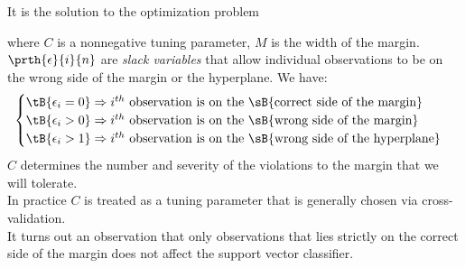 It is the solution to the optimization problem
\begin{center}
\end{center}
where $C$ is a nonnegative tuning parameter, $M$ is the width of the 
margin.\\
$\prth{\epsilon}{i}{n}$ are \emph{slack variables} that allow 
individual observations to be on the wrong side of the margin or the
hyperplane.
We have:
$$
\begin{cases}
	\tB{\epsilon_{i}=0}\Rightarrow i^{th}\text{ observation is on the
	\sB{correct side of the margin}}\\
	\tB{\epsilon_{i}>0}\Rightarrow i^{th}\text{ observation is on the
	\sB{wrong side of the margin}}\\
	\tB{\epsilon_{i}>1}\Rightarrow i^{th}\text{ observation is on the
	\sB{wrong side of the hyperplane}}\\
\end{cases}
$$
$C$ determines the number and severity of the violations to the margin
that we will tolerate.\\

In practice $C$ is treated as a tuning parameter that is generally 
chosen via cross-validation.\\

It turns out an observation that only observations that lies strictly
on the correct side of the margin does not affect the support vector
classifier.
